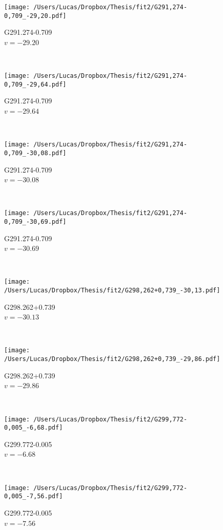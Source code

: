 \begin{figure*}[t]\ContinuedFloat
	\centering
	\begin{subfigure}[t]{0.3\textwidth}
		\texttt{[image: /Users/Lucas/Dropbox/Thesis/fit2/G291,274-0,709\_-29,20.pdf]}
		\caption[]{G291.274-0.709\\$v=-29.20$\,\kms}
	\end{subfigure}
	~
	\begin{subfigure}[t]{0.3\textwidth}
		\texttt{[image: /Users/Lucas/Dropbox/Thesis/fit2/G291,274-0,709\_-29,64.pdf]}
		\caption[]{G291.274-0.709\\$v=-29.64$\,\kms}
	\end{subfigure}
	~
	\begin{subfigure}[t]{0.3\textwidth}
		\texttt{[image: /Users/Lucas/Dropbox/Thesis/fit2/G291,274-0,709\_-30,08.pdf]}
		\caption[]{G291.274-0.709\\$v=-30.08$\,\kms}
	\end{subfigure}
	~
	\begin{subfigure}[t]{0.3\textwidth}
		\texttt{[image: /Users/Lucas/Dropbox/Thesis/fit2/G291,274-0,709\_-30,69.pdf]}
		\caption[]{G291.274-0.709\\$v=-30.69$\,\kms}
	\end{subfigure}
	~
	\begin{subfigure}[t]{0.3\textwidth}
		\texttt{[image: /Users/Lucas/Dropbox/Thesis/fit2/G298,262+0,739\_-30,13.pdf]}
		\caption[]{G298.262+0.739\\$v=-30.13$\,\kms}
	\end{subfigure}
	~
	\begin{subfigure}[t]{0.3\textwidth}
		\texttt{[image: /Users/Lucas/Dropbox/Thesis/fit2/G298,262+0,739\_-29,86.pdf]}
		\caption[]{G298.262+0.739\\$v=-29.86$\,\kms}
	\end{subfigure}
	~
	\begin{subfigure}[t]{0.3\textwidth}
		\texttt{[image: /Users/Lucas/Dropbox/Thesis/fit2/G299,772-0,005\_-6,68.pdf]}
		\caption[]{G299.772-0.005\\$v=-6.68$\,\kms}
	\end{subfigure}
	~
	\begin{subfigure}[t]{0.3\textwidth}
		\texttt{[image: /Users/Lucas/Dropbox/Thesis/fit2/G299,772-0,005\_-7,56.pdf]}
		\caption[]{G299.772-0.005\\$v=-7.56$\,\kms}

\end{subfigure}
\end{figure*}
